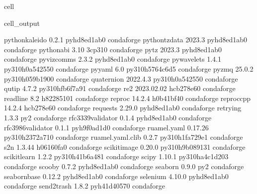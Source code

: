 \documentclass[letterpaper,table,10pt,english]{jupyterBook}
\begin{document}
\begin{sphinxuseclass}{cell}
\begin{sphinxVerbatimOutput}
\begin{sphinxuseclass}{cell_output}
\begin{sphinxVerbatim}[commandchars=\\\{\}]
python\PYGZhy{}kaleido            0.2.1              pyhd8ed1ab\PYGZus{}0    conda\PYGZhy{}forge
python\PYGZhy{}tzdata             2023.3             pyhd8ed1ab\PYGZus{}0    conda\PYGZhy{}forge
python\PYGZus{}abi                3.10                    3\PYGZus{}cp310    conda\PYGZhy{}forge
pytz                      2023.3             pyhd8ed1ab\PYGZus{}0    conda\PYGZhy{}forge
pyviz\PYGZus{}comms               2.3.2              pyhd8ed1ab\PYGZus{}0    conda\PYGZhy{}forge
pywavelets                1.4.1           py310h0a54255\PYGZus{}0    conda\PYGZhy{}forge
pyyaml                    6.0             py310h5764c6d\PYGZus{}5    conda\PYGZhy{}forge
pyzmq                     25.0.2          py310h059b190\PYGZus{}0    conda\PYGZhy{}forge
quaternion                2022.4.3        py310h0a54255\PYGZus{}0    conda\PYGZhy{}forge
qutip                     4.7.2           py310hfb6f7a9\PYGZus{}1    conda\PYGZhy{}forge
re2                       2023.02.02           hcb278e6\PYGZus{}0    conda\PYGZhy{}forge
readline                  8.2                  h8228510\PYGZus{}1    conda\PYGZhy{}forge
reproc                    14.2.4               h0b41bf4\PYGZus{}0    conda\PYGZhy{}forge
reproc\PYGZhy{}cpp                14.2.4               hcb278e6\PYGZus{}0    conda\PYGZhy{}forge
requests                  2.29.0             pyhd8ed1ab\PYGZus{}0    conda\PYGZhy{}forge
retrying                  1.3.3                      py\PYGZus{}2    conda\PYGZhy{}forge
rfc3339\PYGZhy{}validator         0.1.4              pyhd8ed1ab\PYGZus{}0    conda\PYGZhy{}forge
rfc3986\PYGZhy{}validator         0.1.1              pyh9f0ad1d\PYGZus{}0    conda\PYGZhy{}forge
ruamel.yaml               0.17.26         py310h2372a71\PYGZus{}0    conda\PYGZhy{}forge
ruamel.yaml.clib          0.2.7           py310h1fa729e\PYGZus{}1    conda\PYGZhy{}forge
s2n                       1.3.44               h06160fa\PYGZus{}0    conda\PYGZhy{}forge
scikit\PYGZhy{}image              0.20.0          py310h9b08913\PYGZus{}1    conda\PYGZhy{}forge
scikit\PYGZhy{}learn              1.2.2           py310h41b6a48\PYGZus{}1    conda\PYGZhy{}forge
scipy                     1.10.1          py310ha4c1d20\PYGZus{}3    conda\PYGZhy{}forge
scooby                    0.7.2              pyhd8ed1ab\PYGZus{}0    conda\PYGZhy{}forge
seaborn                   0.9.0                      py\PYGZus{}2    conda\PYGZhy{}forge
seaborn\PYGZhy{}base              0.12.2             pyhd8ed1ab\PYGZus{}0    conda\PYGZhy{}forge
selenium                  4.10.0             pyhd8ed1ab\PYGZus{}0    conda\PYGZhy{}forge
send2trash                1.8.2              pyh41d4057\PYGZus{}0    conda\PYGZhy{}forge

\end{sphinxVerbatim}
\end{sphinxuseclass}
\end{sphinxVerbatimOutput}
\end{sphinxuseclass}
\end{document}
